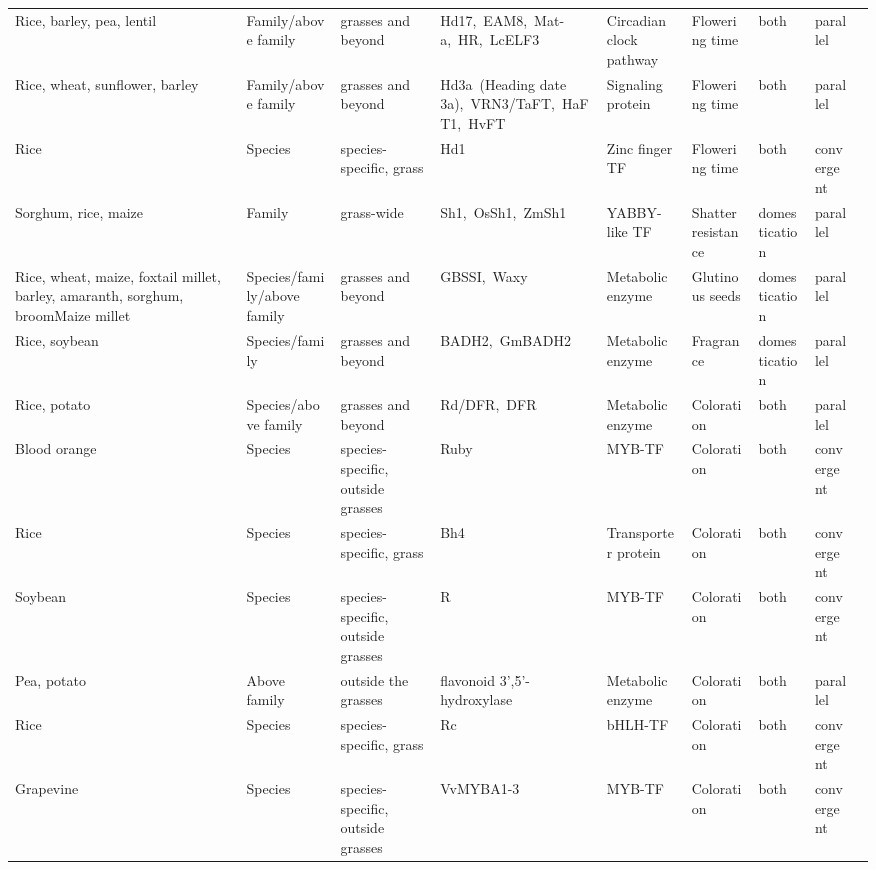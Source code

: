 \documentclass[12pt]{article}
\begin{document}
\begin{table}
\begin{center}
\begin{tabular}{G{3.5cm}G{2.5cm}C{3.10cm}C{3.5cm}C{1.95cm}G{2.0cm}G{1.8cm}G{1.5cm}G{1.5cm}}
Rice, barley, pea, lentil & Family/above family & grasses and beyond & Hd17, EAM8, Mat-a, HR, LcELF3 & Circadian clock pathway & Flowering time & both & parallel & \citep{Weller2012, Matsubara2012, Zakhrabekova2012, Faure2012}\\
Rice, wheat, sunflower, barley & Family/above family & grasses and beyond & Hd3a (Heading date 3a), VRN3/TaFT, HaFT1, HvFT & Signaling protein & Flowering time & both & parallel & \citep{Yan2006, Takahashi2009, Blackman2010}\\
Rice & Species & species-specific, grass & Hd1 & Zinc finger TF & Flowering time & both & convergent & \citep{Martin2013}\\
Sorghum, rice, maize & Family & grass-wide & Sh1, OsSh1, ZmSh1 & YABBY-like TF & Shatter resistance & domestication & parallel & \citep{Lin2012}\\
Rice, wheat, maize, foxtail millet, barley, amaranth, sorghum, broomMaize millet & Species/family/above family & grasses and beyond & GBSSI, Waxy & Metabolic enzyme & Glutinous seeds & domestication & parallel & \cite{Jeon2010, Fan2008, Kawahigashi2013, Kawase2005, Hunt2012, Park2011}\\
Rice, soybean & Species/family & grasses and beyond & BADH2, GmBADH2 & Metabolic enzyme & Fragrance & domestication & parallel & \citep{Kovach2009, Juwattanasomran2010}\\
Rice, potato & Species/above family & grasses and beyond & Rd/DFR, DFR & Metabolic enzyme & Coloration & both & parallel & \citep{Furukawa2006, Zhang2009}\\
Blood orange & Species & species-specific, outside grasses & Ruby & MYB-TF & Coloration & both & convergent & \citep{Butelli2012}\\
Rice & Species & species-specific, grass & Bh4 & Transporter protein & Coloration & both & convergent & \citep{Zhu2011}\\
Soybean & Species & species-specific, outside grasses & R & MYB-TF & Coloration & both & convergent & \citep{Gillman2011}\\
Pea, potato & Above family & outside the grasses & flavonoid 3',5'-hydroxylase & Metabolic enzyme & Coloration & both & parallel & \citep{Martin2013}\\
Rice & Species & species-specific, grass & Rc & bHLH-TF & Coloration & both & convergent & \citep{Martin2013}\\
Grapevine & Species & species-specific, outside grasses & VvMYBA1-3 & MYB-TF & Coloration & both & convergent & \citep{Martin2013}\\

\end{tabular}
\end{center}
\end{table}
\end{document}
